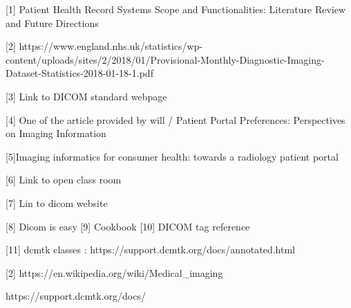 [1] Patient Health Record Systems Scope and Functionalities: Literature Review and Future Directions 

[2] https://www.england.nhs.uk/statistics/wp-content/uploads/sites/2/2018/01/Provisional-Monthly-Diagnostic-Imaging-Dataset-Statistics-2018-01-18-1.pdf


[3] Link to DICOM standard webpage

[4] One of the article provided by will / Patient Portal Preferences: Perspectives on Imaging Information

[5]Imaging informatics for consumer health: towards a radiology patient portal

[6] Link to open class room

[7] Lin to dicom website

[8] Dicom is easy
[9]	Cookbook
[10] DICOM tag reference 

[11] dcmtk classes : https://support.dcmtk.org/docs/annotated.html

[2] https://en.wikipedia.org/wiki/Medical_imaging




https://support.dcmtk.org/docs/


